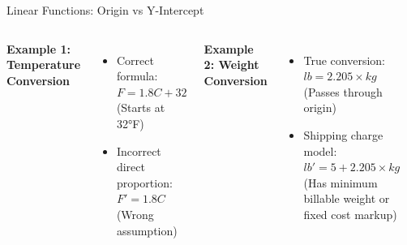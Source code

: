 \documentclass{beamer}
\begin{document}
  \begin{frame}{Linear Functions: Origin vs Y-Intercept}

    \begin{columns}
        \textbf{Example 1: Temperature Conversion}
        \begin{itemize}
            \item Correct formula: \( F = 1.8C + 32 \) (Starts at 32°F)
            \item Incorrect direct proportion: \( F' = 1.8C \) (Wrong assumption)
        \end{itemize}
    
        \textbf{Example 2: Weight Conversion}
        \begin{itemize}
            \item True conversion: \( lb = 2.205 \times kg \) (Passes through origin)
            \item Shipping charge model: \( lb' = 5 + 2.205 \times kg \) (Has minimum billable weight or fixed cost markup)
        \end{itemize}
    
        \centering
        \includegraphics[width=0.8\linewidth]{Celsius to Fahrenheit Comparison.png} \\ %
        \includegraphics[width=0.8\linewidth]{Kilograms to Pounds Comparison.png} %
    \end{columns}
    \end{frame}
\end{document}
